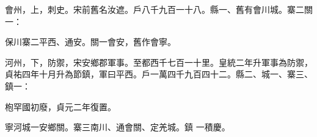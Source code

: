\begin{pinyinscope}
 會州，上，刺史。宋前舊名汝遮。戶八千九百一十八。縣一、舊有會川城。寨二關一：



 保川寨二平西、通安。關一會安，舊作會寧。



 河州，下，防禦，宋安鄉郡軍事。至都西千七百一十里。皇統二年升軍事為防禦，貞祐四年十月升為節鎮，軍曰平西。戶一萬四千九百四十二。縣二、城一、寨三、鎮一：



 枹罕國初廢，貞元二年復置。



 寧河城一安鄉關。寨三南川、通會關、定羌城。鎮
 一積慶。



\end{pinyinscope}